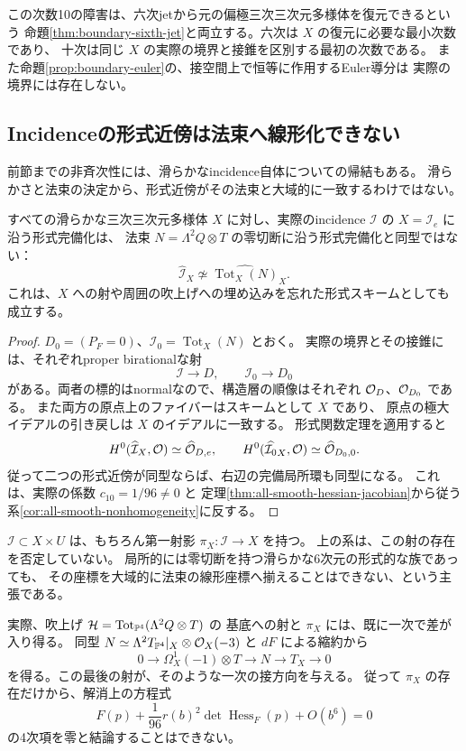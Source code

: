 この次数10の障害は、六次jetから元の偏極三次三次元多様体を復元できるという
命題\ref{thm:boundary-sixth-jet}と両立する。六次は $X$ の復元に必要な最小次数であり、
十次は同じ $X$ の実際の境界と接錐を区別する最初の次数である。
また命題\ref{prop:boundary-euler}の、接空間上で恒等に作用するEuler導分は
実際の境界には存在しない。

\subsection{Incidenceの形式近傍は法束へ線形化できない}
\label{subsec:incidence-formal-neighborhood}

前節までの非斉次性には、滑らかなincidence自体についての帰結もある。
滑らかさと法束の決定から、形式近傍がその法束と大域的に一致するわけではない。

\begin{corollary}[形式法束模型の非存在]
\label{cor:incidence-not-formal-normal-bundle}
すべての滑らかな三次三次元多様体 $X$ に対し、実際のincidence
$\mathcal I$ の $X=\mathcal I_e$ に沿う形式完備化は、
法束 $N=\Lambda^2Q\otimes T$ の零切断に沿う形式完備化と同型ではない：
\[
 \widehat{\mathcal I}_X
 \not\simeq
 \widehat{\operatorname{Tot}_X(N)}_X.
\]
これは、$X$ への射や周囲の吹上げへの埋め込みを忘れた形式スキームとしても成立する。
\end{corollary}
\begin{proof}
$D_0=(P_F=0)$、$\mathcal I_0=\operatorname{Tot}_X(N)$ とおく。
実際の境界とその接錐には、それぞれproper birationalな射
\[
 \mathcal I\longrightarrow D,\qquad
 \mathcal I_0\longrightarrow D_0
\]
がある。両者の標的はnormalなので、構造層の順像はそれぞれ
$\mathcal O_D$、$\mathcal O_{D_0}$ である。
また両方の原点上のファイバーはスキームとして $X$ であり、
原点の極大イデアルの引き戻しは $X$ のイデアルに一致する。
形式関数定理\cite[Theorem 30.20.5, Tag 02OC]{StacksFormalFunctions}を適用すると
\[
 H^0(\widehat{\mathcal I}_X,\mathcal O)
      \simeq\widehat{\mathcal O}_{D,e},\qquad
 H^0(\widehat{\mathcal I_0}_X,\mathcal O)
      \simeq\widehat{\mathcal O}_{D_0,0}.
\]
従って二つの形式近傍が同型ならば、右辺の完備局所環も同型になる。
これは、実際の係数 $c_{10}=1/96\ne0$ と
定理\ref{thm:all-smooth-hessian-jacobian}から従う
系\ref{cor:all-smooth-nonhomogeneity}に反する。
\end{proof}

\begin{remark}[零切断への射との両立]
$\mathcal I\subset X\times U$ は、もちろん第一射影
$\pi_X\colon\mathcal I\to X$ を持つ。
上の系は、この射の存在を否定していない。
局所的には零切断を持つ滑らかな6次元の形式的な族であっても、
その座標を大域的に法束の線形座標へ揃えることはできない、という主張である。

実際、吹上げ
$\mathcal H=\operatorname{Tot}_{\mathbb P^4}(\Lambda^2Q\otimes T)$ の
基底への射と $\pi_X$ には、既に一次で差が入り得る。
同型
$N\simeq\Lambda^2T_{\mathbb P^4}|_X\otimes\mathcal O_X(-3)$ と $dF$ による縮約から
\[
 0\longrightarrow\Omega_X^1(-1)\otimes T
 \longrightarrow N\longrightarrow T_X\longrightarrow0
\]
を得る。この最後の射が、そのような一次の接方向を与える。
従って $\pi_X$ の存在だけから、解消上の方程式
\[
 F(p)+\frac1{96}r(b)^2\det\operatorname{Hess}_F(p)+O(b^6)=0
\]
の4次項を零と結論することはできない。
\end{remark}


